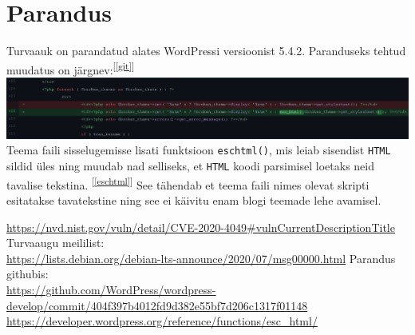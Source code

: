 \documentclass[12pt]{article}
\begin{document}
\section{Parandus}
Turvaauk on parandatud alates WordPressi versioonist 5.4.2. Paranduseks tehtud muudatus on järgnev:\textsuperscript{[\ref{git}]}\\
\includegraphics[scale=0.4]{andmeturve_pilt.png}\\
Teema faili sisselugemisse lisati funktsioon \texttt{esc\textunderscore html()}, mis leiab sisendist \texttt{HTML} sildid üles ning muudab nad selliseks, et \texttt{HTML} koodi parsimisel loetaks neid tavalise tekstina. \textsuperscript{[\ref{eschtml}]} See tähendab et teema faili nimes olevat skripti esitatakse tavatekstine ning see ei käivitu enam blogi teemade lehe avamisel.
\renewcommand{\refname}{Viited}
\begin{thebibliography}{9}
\label{nvd}
\small{\url{https://nvd.nist.gov/vuln/detail/CVE-2020-4049#vulnCurrentDescriptionTitle}}
\label{meilid}
Turvaaugu meililist:\\
\small{\url{https://lists.debian.org/debian-lts-announce/2020/07/msg00000.html}}
\label{git}
Parandus githubis:\\
\small{\url{https://github.com/WordPress/wordpress-develop/commit/404f397b4012fd9d382e55bf7d206c1317f01148}}
\label{eschtml}
\small{\url{https://developer.wordpress.org/reference/functions/esc_html/}}
\end{thebibliography}
\end{document}

